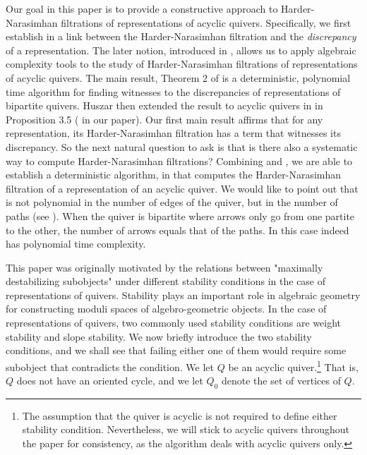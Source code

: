 \documentclass[a4paper]{amsart}
\numberwithin{equation}{section}
\theoremstyle{plain}
\theoremstyle{definition}
\begin{document}
Our goal in this paper is to provide a constructive approach to Harder-Narasimhan filtrations of representations of acyclic quivers. Specifically, we first establish in  a link between the Harder-Narasimhan filtration and the \emph{discrepancy} of a representation. The later notion, introduced in \cite{MR4238986}, allows us to apply algebraic complexity tools to the study of Harder-Narasimhan filtrations of representations of acyclic quivers. The main result, Theorem 2 of \cite{MR4238986} is a deterministic, polynomial time algorithm for finding witnesses to the discrepancies of representations of bipartite quivers. Huszar then extended the result to acyclic quivers in \cite{https://doi.org/10.48550/arxiv.2111.00039} in Proposition 3.5 ( in our paper). Our first main result  affirms that for any representation, its Harder-Narasimhan filtration has a term that witnesses its discrepancy. So the next natural question to ask is that is there also a systematic way to compute Harder-Narasimhan filtrations? Combining  and , we are able to establish a deterministic algorithm,  in  that computes the Harder-Narasimhan filtration of a representation of an acyclic quiver.  We would like to point out that  is not polynomial in the number of edges of the quiver, but in the number of paths (see ). When the quiver is bipartite where arrows only go from one partite to the other, the number of arrows equals that of the paths. In this case  indeed has polynomial time complexity.  

This paper was originally motivated by the relations between "maximally destabilizing subobjects" under different stability conditions in the case of representations of quivers. Stability plays an important role in algebraic geometry for constructing moduli spaces of algebro-geometric objects. In the case of representations of quivers, two commonly used stability conditions are weight stability and slope stability. We now briefly introduce the two stability conditions, and we shall see that failing either one of them would require some subobject that contradicts the condition. We let $Q$ be an acyclic quiver.\footnote[2]{The assumption that the quiver is acyclic is not required to define either stability condition. Nevertheless, we will stick to acyclic quivers throughout the paper for consistency, as the algorithm deals with acyclic quivers only.}  That is, $Q$ does not have an oriented cycle, and we let $Q_0$ denote the set of vertices of $Q$. 
\end{document}
